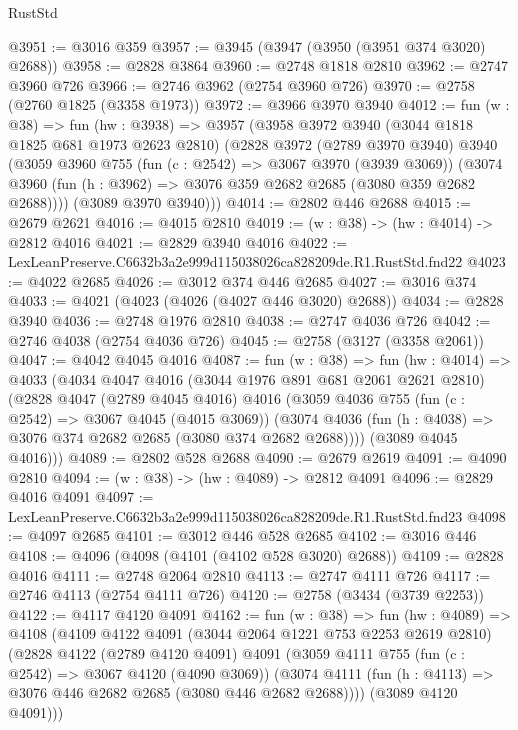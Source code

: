 \begin{lexlean}{RustStd}
\begin{coremodule}
@3951 := @3016 @359
@3957 := @3945 (@3947 (@3950 (@3951 @374 @3020) @2688))
@3958 := @2828 @3864
@3960 := @2748 @1818 @2810
@3962 := @2747 @3960 @726
@3966 := @2746 @3962 (@2754 @3960 @726)
@3970 := @2758 (@2760 @1825 (@3358 @1973))
@3972 := @3966 @3970 @3940
@4012 := fun (w : @38) =>
  fun (hw : @3938) =>
  @3957
    (@3958
      @3972
      @3940
      (@3044 @1818 @1825 @681 @1973 @2623 @2810)
      (@2828
        @3972
        (@2789 @3970 @3940)
        @3940
        (@3059
          @3960
          @755
          (fun (c : @2542) => @3067 @3970 (@3939 @3069))
          (@3074 @3960 (fun (h : @3962) => @3076 @359 @2682 @2685 (@3080 @359 @2682 @2688))))
        (@3089 @3970 @3940)))
@4014 := @2802 @446 @2688
@4015 := @2679 @2621
@4016 := @4015 @2810
@4019 := (w : @38) -> (hw : @4014) -> @2812 @4016
@4021 := @2829 @3940 @4016
@4022 := LexLeanPreserve.C6632b3a2e999d115038026ca828209de.R1.RustStd.fnd22
@4023 := @4022 @2685
@4026 := @3012 @374 @446 @2685
@4027 := @3016 @374
@4033 := @4021 (@4023 (@4026 (@4027 @446 @3020) @2688))
@4034 := @2828 @3940
@4036 := @2748 @1976 @2810
@4038 := @2747 @4036 @726
@4042 := @2746 @4038 (@2754 @4036 @726)
@4045 := @2758 (@3127 (@3358 @2061))
@4047 := @4042 @4045 @4016
@4087 := fun (w : @38) =>
  fun (hw : @4014) =>
  @4033
    (@4034
      @4047
      @4016
      (@3044 @1976 @891 @681 @2061 @2621 @2810)
      (@2828
        @4047
        (@2789 @4045 @4016)
        @4016
        (@3059
          @4036
          @755
          (fun (c : @2542) => @3067 @4045 (@4015 @3069))
          (@3074 @4036 (fun (h : @4038) => @3076 @374 @2682 @2685 (@3080 @374 @2682 @2688))))
        (@3089 @4045 @4016)))
@4089 := @2802 @528 @2688
@4090 := @2679 @2619
@4091 := @4090 @2810
@4094 := (w : @38) -> (hw : @4089) -> @2812 @4091
@4096 := @2829 @4016 @4091
@4097 := LexLeanPreserve.C6632b3a2e999d115038026ca828209de.R1.RustStd.fnd23
@4098 := @4097 @2685
@4101 := @3012 @446 @528 @2685
@4102 := @3016 @446
@4108 := @4096 (@4098 (@4101 (@4102 @528 @3020) @2688))
@4109 := @2828 @4016
@4111 := @2748 @2064 @2810
@4113 := @2747 @4111 @726
@4117 := @2746 @4113 (@2754 @4111 @726)
@4120 := @2758 (@3434 (@3739 @2253))
@4122 := @4117 @4120 @4091
@4162 := fun (w : @38) =>
  fun (hw : @4089) =>
  @4108
    (@4109
      @4122
      @4091
      (@3044 @2064 @1221 @753 @2253 @2619 @2810)
      (@2828
        @4122
        (@2789 @4120 @4091)
        @4091
        (@3059
          @4111
          @755
          (fun (c : @2542) => @3067 @4120 (@4090 @3069))
          (@3074 @4111 (fun (h : @4113) => @3076 @446 @2682 @2685 (@3080 @446 @2682 @2688))))
        (@3089 @4120 @4091)))

\end{coremodule}
\end{lexlean}
